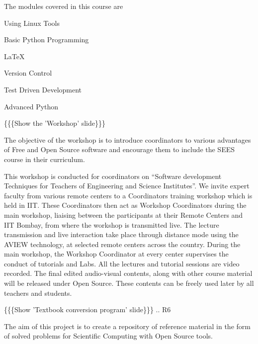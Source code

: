 \documentclass[a4paper,english]{article}
\begin{document}
The modules covered in this course are
\setcounter{listcnt0}{0}
\begin{list}{.}
{
\setlength{\rightmargin}{\leftmargin}
}

\item Using Linux Tools

\item Basic Python Programming

\item LaTeX

\item Version Control

\item Test Driven Development

\item Advanced Python
\end{list}


\{\{\{Show the 'Workshop' slide\}\}\}


The objective of the workshop is to introduce coordinators to various advantages of Free and Open Source software and encourage them to include the SEES course in their curriculum.

This workshop is conducted for coordinators on ``Software development Techniques for Teachers of Engineering and Science Institutes''.  We invite expert faculty from various remote centers to a Coordinators training workshop which is held in IIT. These Coordinators then act as Workshop Coordinators during the main workshop, liaising between the participants at their Remote Centers and IIT Bombay, from where the workshop is transmitted live. The lecture transmission and live interaction take place through distance mode using the AVIEW technology, at selected remote centers across the country. During the main workshop, the Workshop Coordinator at every center supervises the conduct of tutorials and Labs. All the lectures and tutorial sessions are video recorded. The final edited audio-visual contents, along with other course material will be released under Open Source. These contents can be freely used later by all teachers and students.


\{\{\{Show 'Textbook conversion program' slide\}\}\}
.. R6

The aim of this project is to create a repository of reference material in the form of solved problems for Scientific Computing with Open Source tools.
\end{document}
